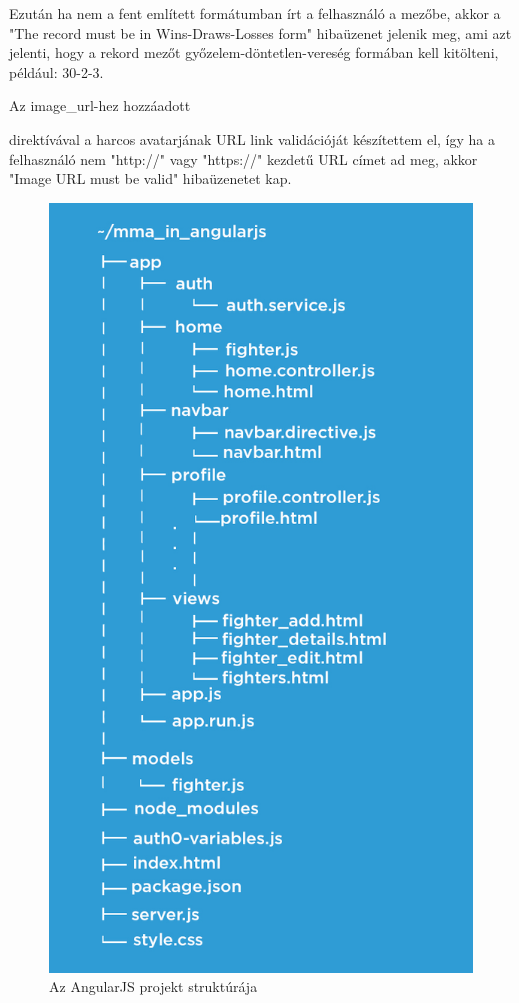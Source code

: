 Ezután ha nem a fent említett formátumban írt a felhasználó a mezőbe, akkor a "The record must be in Wins-Draws-Losses form" hibaüzenet jelenik meg, ami azt jelenti, hogy a rekord mezőt győzelem-döntetlen-vereség formában kell kitölteni, például: 30-2-3.

Az image\_url-hez hozzáadott 
direktívával a harcos avatarjának URL link validációját készítettem el, így ha a felhasználó nem "http://" vagy "https://" kezdetű URL címet ad meg, akkor "Image URL must be valid" hibaüzenetet kap.


\begin{figure}[htb]
\centering
\includegraphics[scale=0.8]{kepek/mma_in_angularjs.jpeg}
\caption{Az AngularJS projekt struktúrája}
\label{fig:angularjs_structure}
\end{figure}

